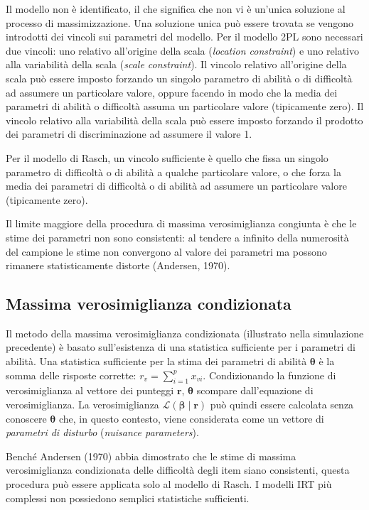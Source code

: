 Il modello non è identificato, il che significa che non vi è un'unica soluzione al processo di massimizzazione.  Una soluzione unica può essere trovata se  vengono introdotti dei vincoli sui parametri del modello.  
Per il modello 2PL sono necessari due vincoli: uno relativo all'origine della scala ({\it location constraint})  e uno relativo alla variabilità della scala ({\it scale constraint}). 
Il vincolo relativo all'origine della scala può essere imposto forzando un singolo parametro di abilità o di difficoltà ad assumere un particolare valore, oppure facendo in modo che la media dei parametri di abilità o difficoltà assuma un particolare valore (tipicamente zero). Il vincolo relativo alla variabilità della scala può essere imposto forzando il prodotto dei parametri di discriminazione ad assumere il valore 1.

Per il modello di Rasch, un  vincolo sufficiente è quello che fissa un singolo parametro di difficoltà o di abilità a qualche particolare valore, o che forza la media dei parametri di difficoltà o di abilità ad assumere un particolare valore (tipicamente zero). 

Il limite maggiore della procedura di massima verosimiglianza congiunta è che le stime dei parametri non sono consistenti: al tendere a infinito della numerosità del campione le stime non convergono al valore dei parametri ma possono rimanere statisticamente distorte (Andersen, 1970).


\subsection{Massima verosimiglianza condizionata}
\label{mv_condizionale}

Il metodo della massima verosimiglianza condizionata (illustrato nella simulazione precedente) è basato sull'esistenza di una statistica sufficiente per i parametri di abilità. Una statistica sufficiente per la stima dei parametri di abilità $\boldsymbol{\theta}$ è la somma delle risposte corrette: $r_v=\sum_{i=1}^p x_{vi}$. Condizionando la funzione di verosimiglianza al vettore dei punteggi $\boldsymbol{r}$, $\boldsymbol{\theta}$ scompare dall'equazione di verosimiglianza. La verosimiglianza $\mathcal{L}(\boldsymbol{\beta \mid r})$ può quindi essere calcolata senza conoscere $\boldsymbol{\theta}$ che, in questo contesto, viene considerata come un vettore di \emph{parametri di disturbo} ({\it nuisance parameters}).

Benché Andersen (1970)  abbia dimostrato che le stime di massima verosimiglianza condizionata delle difficoltà degli item siano consistenti, questa procedura può essere applicata solo al modello di Rasch.  I modelli IRT più complessi non possiedono semplici statistiche sufficienti.


